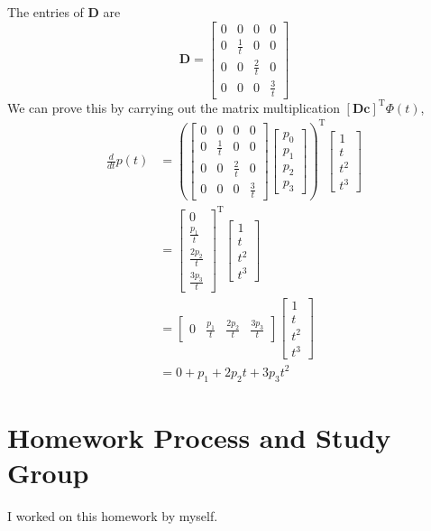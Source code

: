 \documentclass[]{article}
\numberwithin{equation}{section}
\begin{document}
The entries of \(\mathbf{D}\) are 
\begin{equation}
	\mathbf{D} = \begin{bmatrix}
	0 & 0 & 0 & 0 \\
	0 & \frac{1}{t} & 0 & 0 \\
	0 & 0 & \frac{2}{t} & 0 \\
	0 & 0 & 0 & \frac{3}{t}
	\end{bmatrix}
\end{equation}
We can prove this by carrying out the matrix multiplication \([\mathbf{Dc}]^{\text{T}} \Phi(t)\), 
\begin{align}
	\frac{d}{dt} p(t) &= \left(\begin{bmatrix}
	0 & 0 & 0 & 0 \\
	0 & \frac{1}{t} & 0 & 0 \\
	0 & 0 & \frac{2}{t} & 0 \\
	0 & 0 & 0 & \frac{3}{t}
	\end{bmatrix}
	\begin{bmatrix}
	p_0 \\
	p_1 \\
	p_2 \\
	p_3
	\end{bmatrix}\right)^{\text{T}}
	\begin{bmatrix}
	1 \\
	t \\
	t^2 \\
	t^3
	\end{bmatrix} \\
	&=
	\begin{bmatrix}
	0 \\
	\frac{p_1}{t} \\
	\frac{2 p_2}{t} \\
	\frac{3 p_3}{t}
	\end{bmatrix}^{\text{T}} 
	\begin{bmatrix}
	1 \\
	t \\
	t^2 \\
	t^3
	\end{bmatrix} \\
	&= \begin{bmatrix}
	0 & \frac{p_1}{t} & \frac{2 p_2}{t} & \frac{3 p_3}{t}
	\end{bmatrix}
	\begin{bmatrix}
	1 \\
	t \\
	t^2 \\
	t^3
	\end{bmatrix} \\
	&= 0 + p_1 + 2 p_2 t + 3 p_3 t^2
\end{align}



\section{Homework Process and Study Group}

I worked on this homework by myself. 

\newpage


\end{document}
